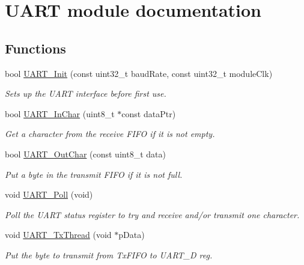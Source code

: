 \hypertarget{group___u_a_r_t__module}{}\section{U\+A\+R\+T module documentation}
\label{group___u_a_r_t__module}
\subsection*{Functions}
\begin{DoxyCompactItemize}
\item 
bool \hyperlink{group___u_a_r_t__module_gae5760d1a086ec79a33901db253000af9}{U\+A\+R\+T\+\_\+\+Init} (const uint32\+\_\+t baud\+Rate, const uint32\+\_\+t module\+Clk)
\begin{DoxyCompactList}\small\item\em Sets up the U\+A\+R\+T interface before first use. \end{DoxyCompactList}\item 
bool \hyperlink{group___u_a_r_t__module_ga03049bcc3bf9af2a75ee77016d3b0d60}{U\+A\+R\+T\+\_\+\+In\+Char} (uint8\+\_\+t $\ast$const data\+Ptr)
\begin{DoxyCompactList}\small\item\em Get a character from the receive F\+I\+F\+O if it is not empty. \end{DoxyCompactList}\item 
bool \hyperlink{group___u_a_r_t__module_gab20ebaeefd1f29d31e098ade31189dda}{U\+A\+R\+T\+\_\+\+Out\+Char} (const uint8\+\_\+t data)
\begin{DoxyCompactList}\small\item\em Put a byte in the transmit F\+I\+F\+O if it is not full. \end{DoxyCompactList}\item 
void \hyperlink{group___u_a_r_t__module_ga799b375101827a18f652a3f28ecefcd0}{U\+A\+R\+T\+\_\+\+Poll} (void)
\begin{DoxyCompactList}\small\item\em Poll the U\+A\+R\+T status register to try and receive and/or transmit one character. \end{DoxyCompactList}\item 
void \hyperlink{group___u_a_r_t__module_ga72031655bb0728aa5e701a65c4f3fa62}{U\+A\+R\+T\+\_\+\+Tx\+Thread} (void $\ast$p\+Data)
\begin{DoxyCompactList}\small\item\em Put the byte to transmit from Tx\+F\+I\+F\+O to U\+A\+R\+T\+\_\+\+D reg. \end{DoxyCompactList}\item 

\end{DoxyCompactItemize}
